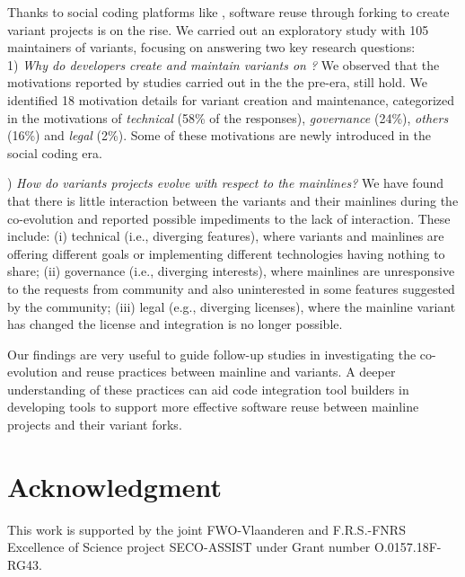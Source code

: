Thanks to social coding platforms like \gh, software reuse through forking to create variant projects is on the rise.
We carried out an exploratory study with 105 maintainers of variants, focusing on answering two key research questions:\\
1) \textit{Why do developers create and maintain variants on \gh?}
We observed that the motivations reported by studies carried out in the the pre-\gh era, still hold. We  identified 18 motivation details  for variant creation and maintenance, categorized in the motivations of \emph{technical} (58\% of the responses), \emph{governance} (24\%), \emph{others} (16\%) and \emph{legal} (2\%). Some of these motivations are newly introduced in the social coding era.

) \textit{How do variants projects evolve with respect to the mainlines?}
We have found that there is little interaction between the variants and their mainlines during the co-evolution and reported possible impediments to the lack of interaction. These include: (i) technical (i.e., diverging features), where variants and mainlines are offering different goals or implementing different technologies having nothing to share; (ii) governance (i.e., diverging interests), where mainlines are unresponsive to the requests from community and also uninterested in some features suggested by the community; (iii) legal (e.g., diverging licenses), where the mainline variant has changed the license and integration is no longer possible.

Our findings are very useful to guide follow-up studies in investigating the co-evolution and reuse practices between mainline and variants. A deeper understanding of these practices can aid code integration tool builders in developing tools to support more effective software reuse between mainline projects and their variant forks.

\section*{Acknowledgment}
This work is supported by the joint FWO-Vlaanderen and F.R.S.-FNRS Excellence of Science project SECO-ASSIST under Grant number O.0157.18F- RG43.



